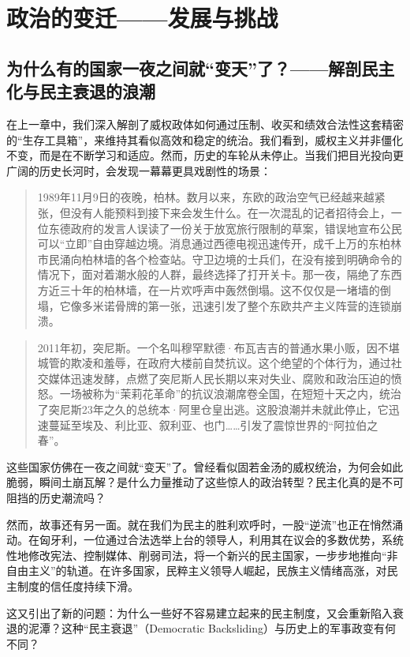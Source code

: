 \part{政治的变迁——发展与挑战}
\chapter{为什么有的国家一夜之间就“变天”了？——解剖民主化与民主衰退的浪潮}

在上一章中，我们深入解剖了威权政体如何通过压制、收买和绩效合法性这套精密的“生存工具箱”，来维持其看似高效和稳定的统治。我们看到，威权主义并非僵化不变，而是在不断学习和适应。然而，历史的车轮从未停止。当我们把目光投向更广阔的历史长河时，会发现一幕幕更具戏剧性的场景：

\begin{quote}
1989年11月9日的夜晚，柏林。数月以来，东欧的政治空气已经越来越紧张，但没有人能预料到接下来会发生什么。在一次混乱的记者招待会上，一位东德政府的发言人误读了一份关于放宽旅行限制的草案，错误地宣布公民可以“立即”自由穿越边境。消息通过西德电视迅速传开，成千上万的东柏林市民涌向柏林墙的各个检查站。守卫边境的士兵们，在没有接到明确命令的情况下，面对着潮水般的人群，最终选择了打开关卡。那一夜，隔绝了东西方近三十年的柏林墙，在一片欢呼声中轰然倒塌。这不仅仅是一堵墙的倒塌，它像多米诺骨牌的第一张，迅速引发了整个东欧共产主义阵营的连锁崩溃。
\end{quote}

\begin{quote}
2011年初，突尼斯。一个名叫穆罕默德·布瓦吉吉的普通水果小贩，因不堪城管的欺凌和羞辱，在政府大楼前自焚抗议。这个绝望的个体行为，通过社交媒体迅速发酵，点燃了突尼斯人民长期以来对失业、腐败和政治压迫的愤怒。一场被称为“茉莉花革命”的抗议浪潮席卷全国，在短短十天之内，统治了突尼斯23年之久的总统本·阿里仓皇出逃。这股浪潮并未就此停止，它迅速蔓延至埃及、利比亚、叙利亚、也门……引发了震惊世界的“阿拉伯之春”。
\end{quote}

这些国家仿佛在一夜之间就“变天”了。曾经看似固若金汤的威权统治，为何会如此脆弱，瞬间土崩瓦解？是什么力量推动了这些惊人的政治转型？民主化真的是不可阻挡的历史潮流吗？

然而，故事还有另一面。就在我们为民主的胜利欢呼时，一股“逆流”也正在悄然涌动。在匈牙利，一位通过合法选举上台的领导人，利用其在议会的多数优势，系统性地修改宪法、控制媒体、削弱司法，将一个新兴的民主国家，一步步地推向“非自由主义”的轨道。在许多国家，民粹主义领导人崛起，民族主义情绪高涨，对民主制度的信任度持续下滑。

这又引出了新的问题：为什么一些好不容易建立起来的民主制度，又会重新陷入衰退的泥潭？这种“民主衰退”（Democratic Backsliding）与历史上的军事政变有何不同？

